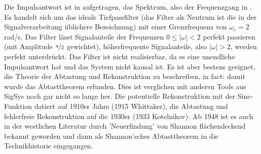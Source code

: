 \begin{Ansatz}
Die Impulsantwort ist in  aufgetragen,
das Spektrum, also der Frequenzgang in .
Es handelt sich um das ideale Tiefpassfilter (das Filter als Neutrum ist die in der
Signalverarbeitung üblichere Bezeichnung) mit einer Grenzfrequenz von $\omega_c=2$ rad/s.
Das Filter lässt Signalanteile der Frequenzen $0\leq |\omega|<2$ perfekt passieren
(mit Amplitude $\nicefrac{\pi}{2}$ gewichtet), höherfrequente
Signalanteile, also $|\omega|>2$, werden perfekt unterdrückt.
Das Filter ist nicht realisierbar, da es eine unendliche Impulsantwort hat
und das System nicht kausal ist.
Es ist aber bestens geeignet, die Theorie der Abtastung und Rekonstruktion
zu beschreiben, in fact: damit wurde das Abtasttheorem erfunden. Dies ist verglichen
mit anderen Tools aus SigSys noch gar nicht so lange her. Die potentielle
Rekonstruktion mit der Sinc-Funktion datiert auf 1910er Jahre (1915 Whittaker),
die Abtastung und fehlerfreie Rekonstruktion auf die 1930er (1933 Kotelnikov).
Ab 1948 ist es auch in der westlichen Literatur durch 'Neuerfindung' von Shannon
flächendeckend bekannt geworden und dann als Shannon'sches Abtasttheorem in die
Technikhistorie eingegangen.
\end{Ansatz}
